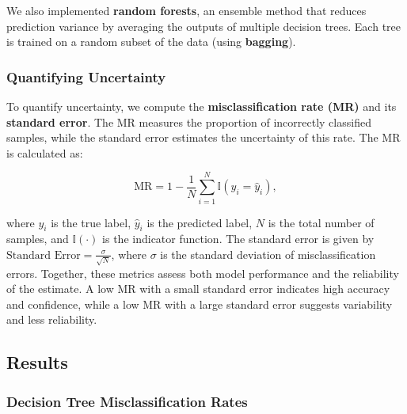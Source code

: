 \documentclass[fleqn,moreauthors,10pt]{ds_report}
\begin{document}
We also implemented \textbf{random forests}, an ensemble method that reduces prediction variance by averaging the outputs of multiple decision trees. Each tree is trained on a random subset of the data (using \textbf{bagging})\cite{MLPP}.
%
%
%


\subsubsection*{Quantifying Uncertainty}


To quantify uncertainty, we compute the \textbf{misclassification rate (MR)} and its \textbf{standard error}. The MR measures the proportion of incorrectly classified samples\cite{MLPP}, while the standard error estimates the uncertainty of this rate. The MR is calculated as:

\[
\text{MR} = 1 - \frac{1}{N} \sum_{i=1}^{N} \mathbb{I}(y_i = \hat{y}_i),
\]

where \( y_i \) is the true label, \( \hat{y}_i \) is the predicted label, \( N \) is the total number of samples, and \( \mathbb{I}(\cdot) \) is the indicator function. The standard error is given by \(\text{Standard Error} = \frac{\sigma}{\sqrt{N}}\), where \(\sigma\) is the standard deviation of misclassification errors. Together, these metrics assess both model performance and the reliability of the estimate. A low MR with a small standard error indicates high accuracy and confidence, while a low MR with a large standard error suggests variability and less reliability.
\subsection*{Results}

\subsubsection*{Decision Tree Misclassification Rates}
\end{document}
